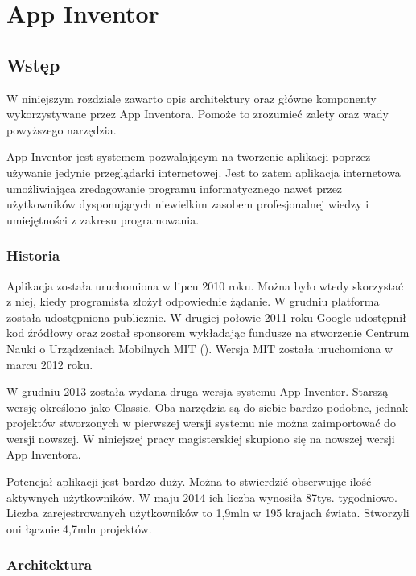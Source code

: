 \chapter{App Inventor}
\label{c3}

\section{Wstęp}
\label{c31}

W niniejszym rozdziale zawarto opis architektury oraz główne komponenty wykorzystywane przez App Inventora. Pomoże to zrozumieć zalety oraz wady powyższego narzędzia.

App Inventor jest systemem pozwalającym na tworzenie aplikacji poprzez używanie jedynie przeglądarki internetowej. Jest to zatem aplikacja internetowa umożliwiająca zredagowanie programu informatycznego nawet przez użytkowników dysponujących niewielkim zasobem profesjonalnej  wiedzy i umiejętności z zakresu programowania.  

\subsection{Historia}

Aplikacja została uruchomiona w lipcu 2010 roku. Można było wtedy skorzystać z niej, kiedy programista złożył odpowiednie żądanie. W grudniu platforma została udostępniona publicznie. W drugiej połowie 2011 roku Google udostępnił kod źródłowy oraz został sponsorem wykładając fundusze na  stworzenie Centrum Nauki o Urządzeniach Mobilnych MIT (). Wersja MIT została uruchomiona w marcu 2012 roku.\cite{android:39}

W grudniu 2013 została wydana druga wersja systemu App Inventor. Starszą wersję określono jako Classic. Oba narzędzia są do siebie bardzo podobne, jednak projektów stworzonych w pierwszej wersji systemu nie można zaimportować do wersji nowszej. W niniejszej pracy magisterskiej skupiono się na nowszej wersji App Inventora. 

Potencjał aplikacji jest bardzo duży. Można to stwierdzić obserwując ilość aktywnych użytkowników. W maju 2014 ich liczba wynosiła 87tys. tygodniowo. Liczba zarejestrowanych użytkowników to 1,9mln w 195 krajach świata. Stworzyli oni łącznie 4,7mln projektów.\cite{article:appinventor1}

\subsection{Architektura}
\label{c32}

